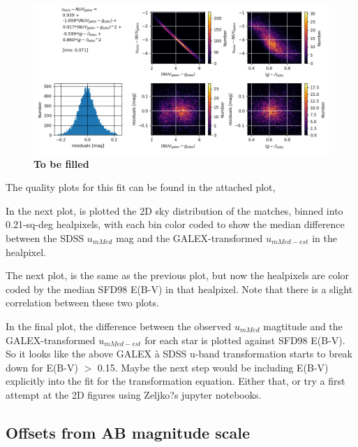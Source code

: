  \begin{figure}[th!]
    \centering\includegraphics[width=14cm]{figures/Galex_QA.png}
\caption{{\bf  To be filled}} 
\label{fig:GalexQA}
\end{figure}
    
The quality plots for this fit can be found in the attached plot,
 
In the next plot,
is plotted the 2D sky distribution of the matches, binned into 0.21-sq-deg healpixels, with each bin color coded to show the median difference between the SDSS $u_{mMed}$ mag and the GALEX-transformed $u_{mMed-est}$ in the healpixel.
 
The next plot,
is the same as the previous plot, but now the healpixels are color coded by the median SFD98 E(B-V) in that healpixel.
Note that there is a slight correlation between these two plots.
 
In the final plot,
the difference between the observed $u_{mMed}$ magtitude and the GALEX-transformed $u_{mMed-est}$ for each star is plotted against SFD98 E(B-V).    So it looks like the above GALEX à SDSS u-band transformation starts to break down for E(B-V) $>$ 0.15.  Maybe the next step would be including E(B-V) explicitly into the fit for the transformation equation.  Either that, or try a first attempt at the 2D figures using Zeljko?s jupyter notebooks.


\subsection{Offsets from AB magnitude scale \label{sec:AB}} 

